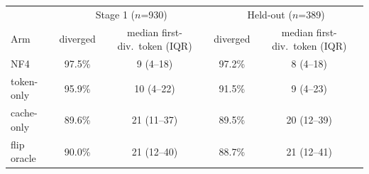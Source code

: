 \begin{tabular}{lcccc}
\toprule
 & \multicolumn{2}{c}{Stage 1 ($n$=930)} & \multicolumn{2}{c}{Held-out ($n$=389)} \\
Arm & diverged & median first-div.\ token (IQR) & diverged & median first-div.\ token (IQR) \\
\midrule
NF4 & 97.5\% & 9 (4--18) & 97.2\% & 8 (4--18) \\
token-only & 95.9\% & 10 (4--22) & 91.5\% & 9 (4--23) \\
cache-only & 89.6\% & 21 (11--37) & 89.5\% & 20 (12--39) \\
flip oracle & 90.0\% & 21 (12--40) & 88.7\% & 21 (12--41) \\
\bottomrule
\end{tabular}
